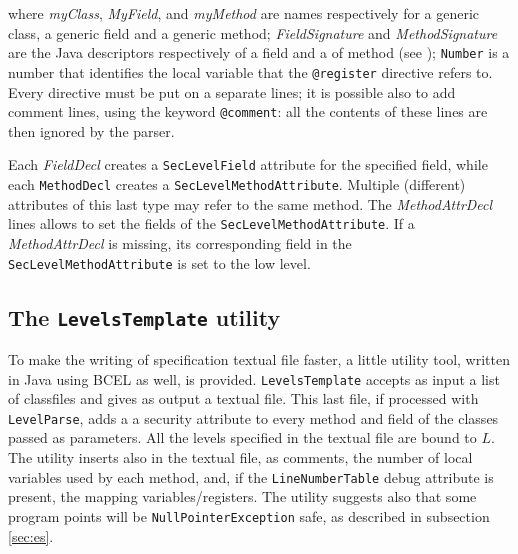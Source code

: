 \documentclass [a4paper,twoside]{article}
\begin{document}
where \emph{myClass}, \emph{MyField}, and \emph{myMethod} are names
respectively for a generic class, a generic field and a generic
method; \emph{FieldSignature} and \emph{MethodSignature} are the Java
descriptors respectively of a field and a of method (see
\cite[\S4.3]{VMSPEC2}); \texttt{Number} is a number that identifies the
local variable that the \texttt{@register} directive refers to. Every
directive must be put on a separate lines; it is possible also to add
comment lines, using the keyword \texttt{@comment}: all the contents of
these lines are then ignored by the parser.  

Each \emph{FieldDecl} creates a \texttt{SecLevelField} attribute for
the specified field, while each \texttt{MethodDecl} creates a
\texttt{SecLevelMethodAttribute}.  Multiple (different) attributes of
this last type may refer to the same method. The \emph{MethodAttrDecl}
lines allows to set the fields of the
\texttt{SecLevelMethodAttribute}. If a \emph{MethodAttrDecl} is
missing, its corresponding field in the
\texttt{SecLevelMethodAttribute} is set to the low level.



\subsection{The \texttt{LevelsTemplate} utility}
\label{sec:template}
To make the writing of specification textual file faster, a little
utility tool, written in Java using BCEL as well, is provided.
\texttt{LevelsTemplate} accepts as input a list of classfiles and
gives as output a textual file. This last file, if processed with
\texttt{LevelParse}, adds a a security attribute to every method and
field of the classes passed as parameters. All the levels specified in
the textual file are bound to $L$. The utility inserts also in the
textual file, as comments, the number of local variables used by each
method, and, if the \texttt{LineNumberTable} debug attribute is
present, the mapping variables/registers. The utility suggests also
that some program points will be \texttt{NullPointerException} safe,
as described in subsection \ref{sec:es}.
\end{document}

